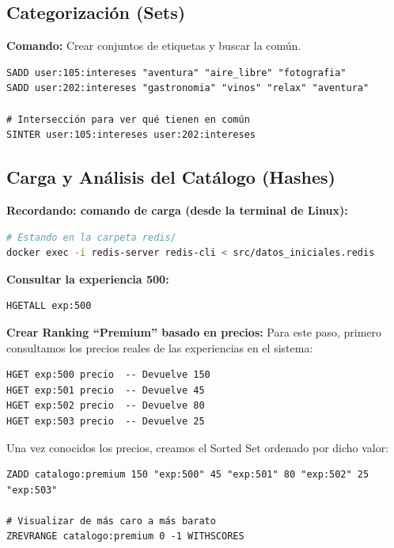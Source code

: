 \documentclass[12pt,a4paper]{article}
\begin{document}
\hypertarget{categorizaciuxf3n-sets}{%
\subsection{Categorización (Sets)}\label{categorizaciuxf3n-sets}}

\textbf{Comando:} Crear conjuntos de etiquetas y buscar la común.

\begin{lstlisting}
SADD user:105:intereses "aventura" "aire_libre" "fotografia"
SADD user:202:intereses "gastronomia" "vinos" "relax" "aventura"

# Intersección para ver qué tienen en común
SINTER user:105:intereses user:202:intereses
\end{lstlisting}

\hypertarget{carga-y-anuxe1lisis-del-catuxe1logo-hashes}{%
\subsection{Carga y Análisis del Catálogo
(Hashes)}\label{carga-y-anuxe1lisis-del-catuxe1logo-hashes}}

\textbf{Recordando: comando de carga (desde la terminal de Linux):}

\begin{lstlisting}[language=bash]
# Estando en la carpeta redis/
docker exec -i redis-server redis-cli < src/datos_iniciales.redis
\end{lstlisting}
\textbf{Consultar la experiencia 500:}

\begin{lstlisting}
HGETALL exp:500
\end{lstlisting}

\textbf{Crear Ranking ``Premium'' basado en precios:} Para este paso, primero consultamos los precios reales de las experiencias en el sistema:

\begin{lstlisting}
HGET exp:500 precio  -- Devuelve 150
HGET exp:501 precio  -- Devuelve 45
HGET exp:502 precio  -- Devuelve 80
HGET exp:503 precio  -- Devuelve 25
\end{lstlisting}

Una vez conocidos los precios, creamos el Sorted Set ordenado por dicho valor:

\begin{lstlisting}
ZADD catalogo:premium 150 "exp:500" 45 "exp:501" 80 "exp:502" 25 "exp:503"

# Visualizar de más caro a más barato
ZREVRANGE catalogo:premium 0 -1 WITHSCORES
\end{lstlisting}
\end{document}
